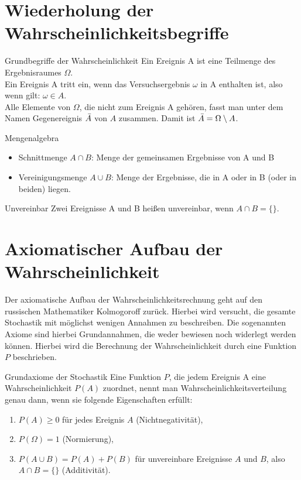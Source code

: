 \section{Wiederholung der Wahrscheinlichkeitsbegriffe}
\begin{merke}{Grundbegriffe der Wahrscheinlichkeit}{}
    Ein Ereignis A ist eine Teilmenge des Ergebnisraumes $\Omega$.\\
    Ein Ereignis A tritt ein, wenn das Versuchsergebnis $\omega$ in A enthalten ist, also wenn gilt: $\omega \in A$.\\
    Alle Elemente von $\Omega$, die nicht zum Ereignis A gehören, fasst man unter dem Namen Gegenereignis $\Bar{A}$ von $A$ zusammen. Damit ist $\Bar{A} = \Omega \setminus A$.
\end{merke}
\begin{b8d}{Mengenalgebra}{}
    \begin{itemize}
        \item Schnittmenge $A\cap B$: Menge der gemeinsamen Ergebnisse von A und B
        \item Vereinigungsmenge $A\cup B$: Menge der Ergebnisse, die in A oder in B (oder in beiden) liegen.
    \end{itemize}
\end{b8d}
\begin{merke}{Unvereinbar}{}
Zwei Ereignisse A und B heißen unvereinbar, wenn $A\cap B = \{ \}$.
\end{merke}
\section{Axiomatischer Aufbau der Wahrscheinlichkeit}
Der axiomatische Aufbau der Wahrscheinlichkeitsrechnung geht auf den russischen Mathematiker Kolmogoroff zurück. Hierbei wird versucht, die gesamte Stochastik mit möglichst wenigen Annahmen zu beschreiben. Die sogenannten Axiome sind hierbei Grundannahmen, die weder bewiesen noch widerlegt werden können. Hierbei wird die Berechnung der Wahrscheinlichkeit durch eine Funktion $P$ beschrieben.\\
\begin{defi}{Grundaxiome der Stochastik}{}
    Eine Funktion $P$, die jedem Ereignis A eine Wahrscheinlichkeit $P(A)$ zuordnet, nennt man Wahrscheinlichkeitsverteilung genau dann, wenn sie folgende Eigenschaften erfüllt:
    \begin{enumerate}
        \item $P(A)\geq 0$ für jedes Ereignis $A$ (Nichtnegativität),
        \item $P(\Omega) = 1$ (Normierung),
        \item $P(A\cup B) = P(A) + P(B)$ für unvereinbare Ereignisse $A$ und $B$, also $A\cap B = \{\}$ (Additivität).
    \end{enumerate}
\end{defi}
